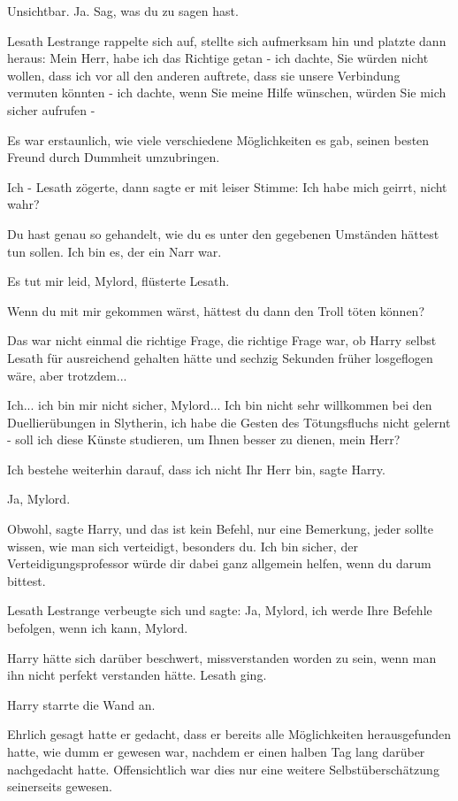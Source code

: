 \glqq Unsichtbar. Ja. Sag, was du zu sagen hast.\grqq{}

Lesath Lestrange rappelte sich auf, stellte sich aufmerksam hin und platzte dann
heraus: \glqq Mein Herr, habe ich das Richtige getan - ich dachte, Sie würden
nicht wollen, dass ich vor all den anderen auftrete, dass sie unsere Verbindung
vermuten könnten - ich dachte, wenn Sie meine Hilfe wünschen, würden Sie mich
sicher aufrufen -\grqq{}

Es war erstaunlich, wie viele verschiedene Möglichkeiten es gab, seinen besten
Freund durch Dummheit umzubringen.

\glqq Ich -\grqq{} Lesath zögerte, dann sagte er mit leiser Stimme: \glqq Ich
habe mich geirrt, nicht wahr?\grqq{}

\glqq Du hast genau so gehandelt, wie du es unter den gegebenen Umständen
hättest tun sollen. Ich bin es, der ein Narr war.\grqq{}

\glqq Es tut mir leid, Mylord\grqq{}, flüsterte Lesath.

\glqq Wenn du mit mir gekommen wärst, hättest du dann den Troll töten
können?\grqq{}

Das war nicht einmal die richtige Frage, die richtige Frage war, ob Harry selbst
Lesath für ausreichend gehalten hätte und sechzig Sekunden früher losgeflogen
wäre, aber trotzdem...

\glqq Ich... ich bin mir nicht sicher, Mylord... Ich bin nicht sehr willkommen
bei den Duellierübungen in Slytherin, ich habe die Gesten des Tötungsfluchs
nicht gelernt - soll ich diese Künste studieren, um Ihnen besser zu dienen, mein
Herr?\grqq{}

\glqq Ich bestehe weiterhin darauf, dass ich nicht Ihr Herr bin\grqq{}, sagte
Harry.

\glqq Ja, Mylord.\grqq{}

\glqq Obwohl\grqq{}, sagte Harry, \glqq und das ist kein Befehl, nur eine
Bemerkung, jeder sollte wissen, wie man sich verteidigt, besonders du. Ich bin
sicher, der Verteidigungsprofessor würde dir dabei ganz allgemein helfen, wenn
du darum bittest.\grqq{}

Lesath Lestrange verbeugte sich und sagte: \glqq Ja, Mylord, ich werde Ihre
Befehle befolgen, wenn ich kann, Mylord.\grqq{}

Harry hätte sich darüber beschwert, missverstanden worden zu sein, wenn man ihn
nicht perfekt verstanden hätte. Lesath ging.

Harry starrte die Wand an.

Ehrlich gesagt hatte er gedacht, dass er bereits alle Möglichkeiten
herausgefunden hatte, wie dumm er gewesen war, nachdem er einen halben Tag lang
darüber nachgedacht hatte. Offensichtlich war dies nur eine weitere
Selbstüberschätzung seinerseits gewesen.

